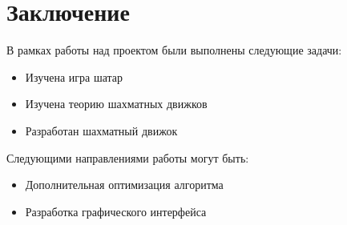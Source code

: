 {

	\chapter*{Заключение}
	В рамках работы над проектом были выполнены следующие задачи:
	\begin{itemize}
		\item Изучена игра шатар
		\item Изучена теорию шахматных движков
		\item Разработан шахматный движок
	\end{itemize}

	Следующими направлениями работы могут быть:
	\begin{itemize}
		\item Дополнительная оптимизация алгоритма
		\item Разработка графического интерфейса
	\end{itemize}
	\clearpage

}